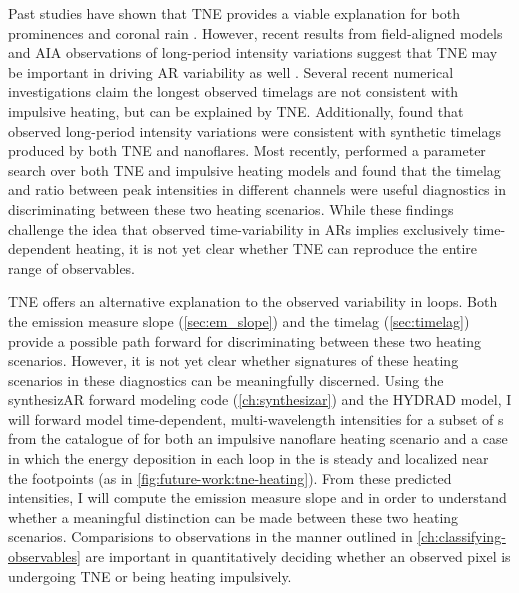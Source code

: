 Past studies have shown that TNE provides a viable explanation for both prominences \citep{antiochos_model_1991,muller_dynamics_2003} and coronal rain \citep{antolin_coronal_2010,antolin_multithermal_2015,auchere_coronal_2018}. However, recent results from field-aligned models \citep{mikic_importance_2013} and AIA observations of long-period intensity variations \citep{auchere_long-period_2014,froment_evidence_2015,auchere_thermal_2016} suggest that TNE may be important in driving AR variability as well \citep[though see][]{klimchuk_can_2010}. Several recent numerical investigations \citep{lionello_can_2016,winebarger_investigation_2016} claim the longest observed timelags are not consistent with impulsive heating, but can be explained by TNE. Additionally, \citet{froment_long-period_2017} found that observed long-period intensity variations were consistent with synthetic timelags produced by both TNE and nanoflares. Most recently, \citet{winebarger_identifying_2018} performed a parameter search over both TNE and impulsive heating models and found that the timelag and ratio between peak intensities in different channels were useful diagnostics in discriminating between these two heating scenarios. While these findings challenge the idea that observed time-variability in ARs implies exclusively time-dependent heating, it is not yet clear whether TNE can reproduce the entire range of observables.

TNE offers an alternative explanation to the observed variability in \AR{} loops. Both the emission measure slope (\autoref{sec:em_slope}) and the timelag (\autoref{sec:timelag}) provide a possible path forward for discriminating between these two heating scenarios. However, it is not yet clear whether signatures of these heating scenarios in these diagnostics can be meaningfully discerned. Using the synthesizAR forward modeling code (\autoref{ch:synthesizar}) and the HYDRAD model, I will forward model time-dependent, multi-wavelength intensities for a subset of \AR s from the catalogue of \citet{warren_systematic_2012} for both an impulsive nanoflare heating scenario and a case in which the energy deposition in each loop in the \AR{} is steady and localized near the footpoints (as in \autoref{fig:future-work:tne-heating}). From these predicted intensities, I will compute the emission measure slope and in order to understand whether a meaningful distinction can be made between these two heating scenarios. Comparisions to observations in the manner outlined in \autoref{ch:classifying-observables} are important in quantitatively deciding whether an observed pixel is undergoing TNE or being heating impulsively.
